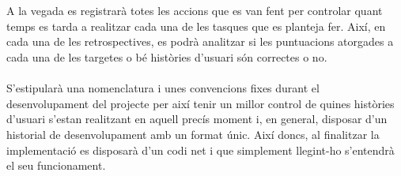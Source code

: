 \\\\
A la vegada es registrarà totes les accions que es van fent per controlar quant temps es tarda a realitzar cada una de les tasques que es planteja fer. Així, en cada una de les retrospectives, es podrà analitzar si les puntuacions atorgades a cada una de les targetes o bé històries d'usuari són correctes o no.
\\\\
S'estipularà una nomenclatura i unes convencions fixes durant el desenvolupament del projecte per així tenir un millor control de quines històries d'usuari s'estan realitzant en aquell precís moment i, en general, disposar d'un historial de desenvolupament amb un format únic. Així doncs, al finalitzar la implementació es disposarà d'un codi net i que simplement llegint-ho s'entendrà el seu funcionament.

